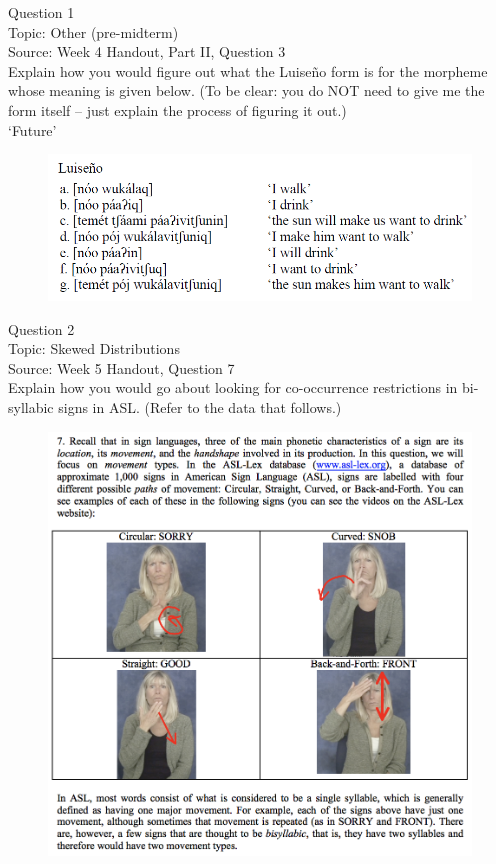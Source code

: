 \documentclass[12pt]{article}
\begin{document}
{\large Question 1}\\

Topic: Other (pre-midterm)\\
Source: Week 4 Handout, Part II, Question 3\\

Explain how you would figure out what the Luiseño form is for the morpheme whose meaning is given below. (To be clear: you do NOT need to give me the form itself -- just explain the process of figuring it out.)\\

‘Future’

\begin{figure}[H]
\includegraphics{../images/luiseno.png}
\end{figure}

\newpage

{\large Question 2}\\

Topic: Skewed Distributions\\
Source: Week 5 Handout, Question 7\\

Explain how you would go about looking for co-occurrence restrictions in bi-syllabic signs in ASL. (Refer to the data that follows.)\\

\begin{figure}[H]
\includegraphics{../images/ASL_movement.png}
\end{figure}
\end{document}

